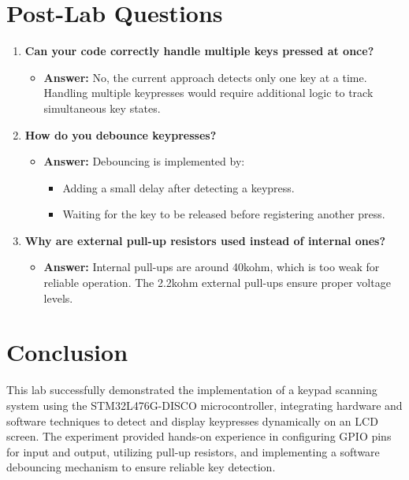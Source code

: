 \documentclass[12pt]{article}
\begin{document}
\section{Post-Lab Questions}

\begin{enumerate}
    \item \textbf{Can your code correctly handle multiple keys pressed at once?}  
    \begin{itemize}
    \item \textbf{Answer:} No, the current approach detects only one key at a time. Handling multiple keypresses would require additional logic to track simultaneous key states.
\end{itemize}

    \item \textbf{How do you debounce keypresses?}  
    
    \begin{itemize}
    \item \textbf{Answer:} Debouncing is implemented by:
        \begin{itemize}
        \item Adding a small delay after detecting a keypress.
        \item Waiting for the key to be released before registering another press.
        \end{itemize}
    \end{itemize}

    \item \textbf{Why are external pull-up resistors used instead of internal ones?}  
    \begin{itemize}
        \item \textbf{Answer:} Internal pull-ups are around 40kohm, which is too weak for reliable operation. The 2.2kohm external pull-ups ensure proper voltage levels.
    \end{itemize}
    
\end{enumerate}

\section{Conclusion}

This lab successfully demonstrated the implementation of a keypad scanning system using the STM32L476G-DISCO microcontroller, integrating hardware and software techniques to detect and display keypresses dynamically on an LCD screen. The experiment provided hands-on experience in configuring GPIO pins for input and output, utilizing pull-up resistors, and implementing a software debouncing mechanism to ensure reliable key detection.
\end{document}
